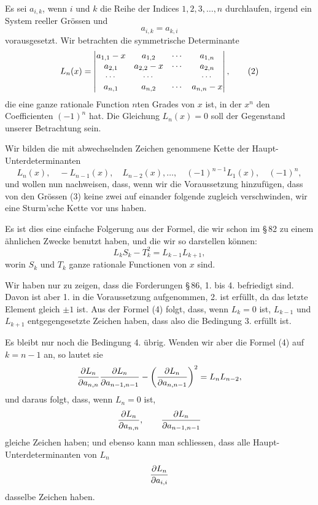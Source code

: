 \documentclass[11pt]{article}
\begin{document}
Es sei $a_{i,k}$, wenn $i$ und $k$ die Reihe der Indices $1,2,3,\ldots,n$ durchlaufen, irgend ein System reeller Gr\"ossen und
\begin{equation}
        a_{i,k}=a_{k,i}
\tag{1}
\end{equation}
vorausgesetzt. Wir betrachten die symmetrische Determinante
\begin{equation}
        L_n(x)=
        \begin{vmatrix}
        a_{1,1}-x&a_{1,2}&\cdots&a_{1,n}\cr
        a_{2,1}&a_{2,2}-x&\cdots&a_{2,n}\cr
        \cdots&\cdots&&\cdots\cr
        a_{n,1}&a_{n,2}&\cdots&a_{n,n}-x
        \end{vmatrix},
\tag{2}
\end{equation}
die eine ganze rationale Function $n$ten Grades von $x$ ist, in der $x^n$ den Coefficienten $(-1)^n$ hat. Die Gleichung $L_n(x)=0$ soll der Gegenstand unserer Betrachtung sein.

Wir bilden die mit abwechselnden Zeichen genommene Kette der Haupt-Unterdeterminanten
\begin{equation}
        L_n(x),
        \quad -L_{n-1}(x),
        \quad L_{n-2}(x),
        \ldots,
        \quad (-1)^{n-1}L_1(x),
        \quad (-1)^n,
\tag{3}
\end{equation}
und wollen nun nachweisen, dass, wenn wir die Voraussetzung hinzuf\"ugen, dass von den Gr\"ossen (3) keine zwei auf einander folgende zugleich verschwinden, wir eine Sturm'sche Kette vor uns haben.

Es ist dies eine einfache Folgerung aus der Formel, die wir schon im \S\,82 zu einem \"ahnlichen Zwecke benutzt haben, und die wir so darstellen k\"onnen:
\begin{equation}
        L_kS_k-T_k^2=L_{k-1}L_{k+1},
\tag{4}
\end{equation}
worin $S_k$ und $T_k$ ganze rationale Functionen von $x$ sind.

Wir haben nur zu zeigen, dass die Forderungen \S\,86, 1. bis 4. befriedigt sind. Davon ist aber 1. in die Voraussetzung aufgenommen, 2. ist erf\"ullt, da das letzte Element gleich $\pm1$ ist. Aus der Formel (4) folgt, dass, wenn $L_k=0$ ist, $L_{k-1}$ und $L_{k+1}$ entgegengesetzte Zeichen haben, dass also die Bedingung 3. erf\"ullt ist.

Es bleibt nur noch die Bedingung 4. \"ubrig. Wenden wir aber die Formel (4) auf $k=n-1$ an, so lautet sie
\[
        {\partial L_n\over\partial a_{n,n}}
        {\partial L_n\over\partial a_{n-1,n-1}}
        -\left({\partial L_n\over\partial a_{n,n-1}}\right)^2
        =L_nL_{n-2},
\]
und daraus folgt, dass, wenn $L_n=0$ ist,
\[
        {\partial L_n\over\partial a_{n,n}},
        \qquad
        {\partial L_n\over\partial a_{n-1,n-1}}
\]
gleiche Zeichen haben; und ebenso kann man schliessen, dass alle Haupt-Unterdeterminanten von $L_n$
\[
        {\partial L_n\over\partial a_{i,i}}
\]
dasselbe Zeichen haben.
\end{document}

